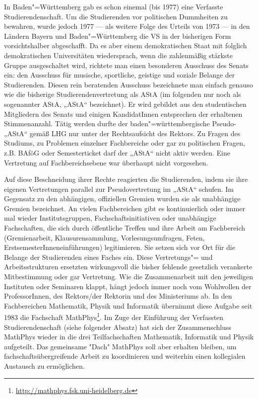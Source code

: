 In Baden"=Württemberg gab es schon einemal (bis 1977) eine Verfasste
Studierendenschaft. Um die Studierenden vor politischen Dummheiten zu
bewahren, wurde jedoch 1977 — als weitere Folge des Urteils von 1973 — in
den Ländern Bayern und Baden"=Württemberg die VS in der bisherigen Form
vorsichtshalber abgeschafft. Da es aber einem demokratischen Staat mit
folglich demokratischen Universitäten wiedersprach, wenn die
zahlenmäßig stärkste Gruppe ausgeschaltet wird, richtete man einen
besonderen Ausschuss des Senats ein: den Ausschuss für musische,
sportliche, geistige und soziale Belange der Studierenden. Diesen rein
beratenden Ausschuss bezeichnete man einfach genauso wie die bisherige
Studierendenvertretung als AStA (im folgenden nur noch als sogenannter
AStA, „AStA“ bezeichnet). Er wird gebildet aus den studentischen
Mitgliedern des Senats und einigen KandidatInnen entsprechen der
erhaltenen Stimmenanzahl. Tätig werden durfte der baden"=württembergische
Pseudo-„AStA“ gemäß LHG nur unter der Rechtsaufsicht des Rektors. Zu
Fragen des Studiums, zu Problemen einzelner Fachbereiche oder gar zu
politischen Fragen, z.B. BAföG oder Semesterticket darf der „AStA“ nicht
aktiv werden. Eine Vertretung auf Fachbereichsebene war überhaupt nicht
vorgesehen.

Auf diese Beschneidung ihrer Rechte reagierten die
Studierenden, indem sie ihre eigenen Vertretungen parallel zur
Pseudovertretung im „AStA“ schufen. Im Gegensatz zu den abhängigen,
offiziellen Gremien wurden sie als unabhängige Gremien bezeichnet.
An vielen Fachbereichen gibt es kontinuierlich oder immer mal wieder
Institutsgruppen, Fachschaftsinitiativen oder unabhängige Fachschaften,
die sich durch öffentliche Treffen und ihre Arbeit am Fachbereich
(Gremienarbeit, Klausurensammlung, Vorlesungsumfragen, Feten,
ErstsemesterInneneinführungen) legitimieren. Sie setzen sich vor Ort für
die Belange der Studierenden eines Faches ein. Diese Vertretungs"= und
Arbeitsstrukturen ersetzten wirkungsvoll die bisher fehlende gesetzlich verankerte
Mitbestimmung oder gar Vertretung. Wie die Zusammenarbeit mit den
jeweiligen Instituten oder Seminaren klappt, hängt jedoch immer noch vom
Wohlwollen der ProfessorInnen, des Rektors/der Rektorin und des Ministeriums ab. In den
Fachbereichen Mathematik, Physik und Informatik übernimmt diese Aufgabe
seit 1983 die Fachschaft MathPhys\footnote{\url{http://mathphys.fsk.uni-heidelberg.de}}.
Im Zuge der Einführung der Verfassten Studierendenschaft (siehe folgender Absatz) hat sich der Zusammenschluss MathPhys
wieder in die drei Teilfachschaften Mathematik, Informatik und Physik aufgeteilt.
Das gemeinsame "Dach" MathPhys soll aber erhalten bleiben, um fachschaftsübergreifende
Arbeit zu koordinieren und weiterhin einen kollegialen Austausch zu ermöglichen.


